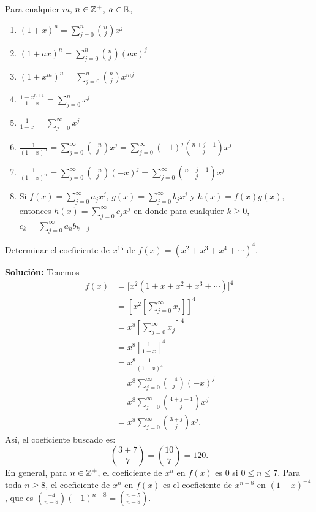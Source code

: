 \begin{BOX}
    Para cualquier $m$, $n \in \ZZ[+]$, $a \in \RR$,
    \begin{enumerate}
        \item $\displaystyle (1 + x)^n = \sum_{j=0}^{n} \binom{n}{j} x^j$
        \item $\displaystyle (1 + ax)^n = \sum_{j=0}^{n} \binom{n}{j} (ax)^j$
        \item $\displaystyle \left(1 + x^m\right)^n = \sum_{j=0}^{n} \binom{n}{j} x^{mj}$
        \item $\displaystyle \frac{1-x^{n+1}}{1-x} = \sum_{j=0}^n x^j$
        \item $\displaystyle \frac{1}{1-x} = \sum_{j=0}^{\infty} x^j$
        \item $\displaystyle \frac{1}{(1+x)^n} = \sum_{j=0}^{\infty} \binom{-n}{j}x^j = \sum_{j=0}^{\infty} (-1)^j \binom{n+j-1}{j} x^j$
        \item $\displaystyle \frac{1}{(1-x)^n} = \sum_{j=0}^{\infty} \binom{-n}{j}(-x)^j = \sum_{j=0}^{\infty} \binom{n+j-1}{j}x^j$
        \item Si $\displaystyle f(x) = \sum_{j=0}^{\infty} a_j x^j$, $\displaystyle g(x) = \sum_{j=0}^{\infty} b_j x^j$ y $h(x) = f(x)g(x)$, entonces $\displaystyle h(x) = \sum_{j=0}^{\infty} c_j x^j$ en donde para cualquier $k \geq 0$, $\displaystyle c_k = \sum_{j=0}^{\infty} a_h b_{k-j}$
    \end{enumerate}
\end{BOX}

\begin{myexample}
    Determinar el coeficiente de $x^{15}$ de $f(x) = \left( x^2 + x^3 + x^4 + \cdots \right)^4$.

    \tcblower
    \textbf{\color{jblueleft}Solución:} Tenemos
    \begin{align*}
        f(x) & = \big[ x^2 (1 + x + x^2 + x^3 + \cdots ) \big]^4 \\
        & = \left[ x^2 \left[ \sum_{j=0}^{\infty} x_j \right] \right]^4 \\
        & = x^8 \left[ \sum_{j=0}^{\infty} x_j \right]^4 \\
        & = x^8 \left[ \frac{1}{1-x} \right]^4 \\
        & = x^8 \frac{1}{(1-x)^4} \\
        & = x^8 \sum_{j=0}^{\infty} \binom{-4}{j} (-x)^j \\
        & = x^8 \sum_{j=0}^{\infty} \binom{4+j-1}{j} x^j \\
        & = x^8 \sum_{j=0}^{\infty} \binom{3+j}{j} x^j.
    \end{align*}
    Así, el coeficiente buscado es:
    $$\binom{3+7}{7} = \binom{10}{7} = 120.$$
    En general, para $n \in \ZZ[+]$, el coeficiente de $x^n$ en $f(x)$ es 0 si $0 \leq n \leq 7$. Para toda $n \geq 8$, el coeficiente de $x^n$ en $f(x)$ es el coeficiente de $x^{n-8}$ en $(1-x)^{-4}$, que es $\displaystyle \binom{-4}{n-8}(-1)^{n-8} = \binom{n-5}{n-8}$.
\end{myexample}

